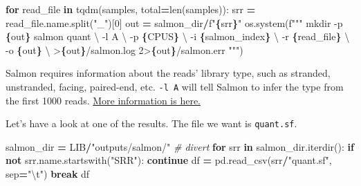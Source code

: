 \documentclass[
]{book}
\newenvironment{Shaded}{\begin{snugshade}}{\end{snugshade}}
\newcommand{\BuiltInTok}[1]{#1}
\newcommand{\CharTok}[1]{\textcolor[rgb]{0.31,0.60,0.02}{#1}}
\newcommand{\CommentTok}[1]{\textcolor[rgb]{0.56,0.35,0.01}{\textit{#1}}}
\newcommand{\ControlFlowTok}[1]{\textcolor[rgb]{0.13,0.29,0.53}{\textbf{#1}}}
\newcommand{\DecValTok}[1]{\textcolor[rgb]{0.00,0.00,0.81}{#1}}
\newcommand{\KeywordTok}[1]{\textcolor[rgb]{0.13,0.29,0.53}{\textbf{#1}}}
\newcommand{\NormalTok}[1]{#1}
\newcommand{\OperatorTok}[1]{\textcolor[rgb]{0.81,0.36,0.00}{\textbf{#1}}}
\newcommand{\SpecialCharTok}[1]{\textcolor[rgb]{0.81,0.36,0.00}{\textbf{#1}}}
\newcommand{\SpecialStringTok}[1]{\textcolor[rgb]{0.31,0.60,0.02}{#1}}
\newcommand{\StringTok}[1]{\textcolor[rgb]{0.31,0.60,0.02}{#1}}
\begin{document}
\begin{Shaded}
\begin{Highlighting}[numbers=left,,]
\ControlFlowTok{for}\NormalTok{ read\_file }\KeywordTok{in}\NormalTok{ tqdm(samples, total}\OperatorTok{=}\BuiltInTok{len}\NormalTok{(samples)):}
\NormalTok{    srr }\OperatorTok{=}\NormalTok{ read\_file.name.split(}\StringTok{"\_"}\NormalTok{)[}\DecValTok{0}\NormalTok{]}
\NormalTok{    out }\OperatorTok{=}\NormalTok{ salmon\_dir}\OperatorTok{/}\SpecialStringTok{f"}\SpecialCharTok{\{}\NormalTok{srr}\SpecialCharTok{\}}\SpecialStringTok{"}
\NormalTok{    os.system(}\SpecialStringTok{f"""}
\SpecialStringTok{        mkdir {-}p }\SpecialCharTok{\{}\NormalTok{out}\SpecialCharTok{\}}
\SpecialStringTok{        salmon quant }\CharTok{\textbackslash{}}
\SpecialStringTok{            {-}l A }\CharTok{\textbackslash{}}
\SpecialStringTok{            {-}p }\SpecialCharTok{\{}\NormalTok{CPUS}\SpecialCharTok{\}}\SpecialStringTok{ }\CharTok{\textbackslash{}}
\SpecialStringTok{            {-}i }\SpecialCharTok{\{}\NormalTok{salmon\_index}\SpecialCharTok{\}}\SpecialStringTok{ }\CharTok{\textbackslash{}}
\SpecialStringTok{            {-}r }\SpecialCharTok{\{}\NormalTok{read\_file}\SpecialCharTok{\}}\SpecialStringTok{ }\CharTok{\textbackslash{}}
\SpecialStringTok{            {-}o }\SpecialCharTok{\{}\NormalTok{out}\SpecialCharTok{\}}\SpecialStringTok{ }\CharTok{\textbackslash{}}
\SpecialStringTok{            \textgreater{}}\SpecialCharTok{\{}\NormalTok{out}\SpecialCharTok{\}}\SpecialStringTok{/salmon.log 2\textgreater{}}\SpecialCharTok{\{}\NormalTok{out}\SpecialCharTok{\}}\SpecialStringTok{/salmon.err}
\SpecialStringTok{    """}\NormalTok{)}
\end{Highlighting}
\end{Shaded}

Salmon requires information about the reads' library type, such as stranded, unstranded, facing, paired-end, etc. \texttt{-l\ A} will tell Salmon to infer the type
from the first 1000 reads. \href{https://salmon.readthedocs.io/en/latest/salmon.html\#what-s-this-libtype}{More information is here.}

Let's have a look at one of the results. The file we want is \texttt{quant.sf}.

\begin{Shaded}
\begin{Highlighting}[numbers=left,,]
\NormalTok{salmon\_dir }\OperatorTok{=}\NormalTok{ LIB}\OperatorTok{/}\StringTok{"outputs/salmon/"} \CommentTok{\# divert}
\ControlFlowTok{for}\NormalTok{ srr }\KeywordTok{in}\NormalTok{ salmon\_dir.iterdir():}
    \ControlFlowTok{if} \KeywordTok{not}\NormalTok{ srr.name.startswith(}\StringTok{"SRR"}\NormalTok{): }\ControlFlowTok{continue}
\NormalTok{    df }\OperatorTok{=}\NormalTok{ pd.read\_csv(srr}\OperatorTok{/}\StringTok{"quant.sf"}\NormalTok{, sep}\OperatorTok{=}\StringTok{"}\CharTok{\textbackslash{}t}\StringTok{"}\NormalTok{)}
    \ControlFlowTok{break}
\NormalTok{df}
\end{Highlighting}
\end{Shaded}
\end{document}
